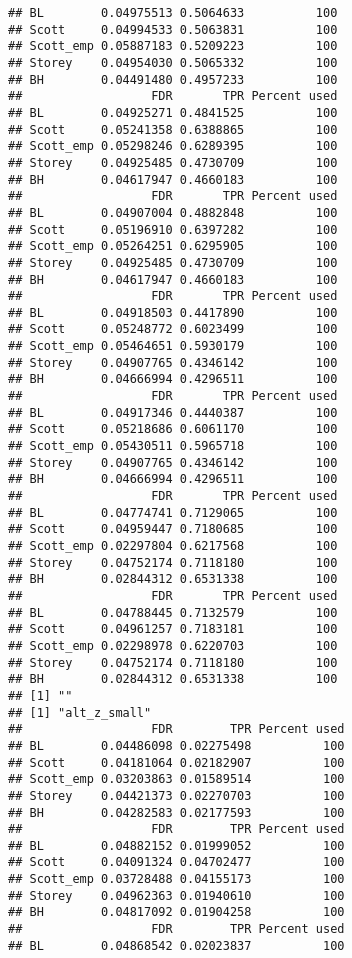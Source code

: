 \documentclass{article}\usepackage[]{graphicx}\usepackage[]{color}
\makeatletter
\newenvironment{kframe}{%
 \def\at@end@of@kframe{}%
 \ifinner\ifhmode%
  \def\at@end@of@kframe{\end{minipage}}%
  \begin{minipage}{\columnwidth}%
 \fi\fi%
 \def\FrameCommand##1{\hskip\@totalleftmargin \hskip-\fboxsep
 \colorbox{shadecolor}{##1}\hskip-\fboxsep
     \hskip-\linewidth \hskip-\@totalleftmargin \hskip\columnwidth}%
 \MakeFramed {\advance\hsize-\width
   \@totalleftmargin\z@ \linewidth\hsize
   \@setminipage}}%
 {\par\unskip\endMakeFramed%
 \at@end@of@kframe}
\newenvironment{knitrout}{}{} %
\makeatother
\begin{document}
\begin{knitrout}
\begin{kframe}
\begin{verbatim}
## BL        0.04975513 0.5064633          100
## Scott     0.04994533 0.5063831          100
## Scott_emp 0.05887183 0.5209223          100
## Storey    0.04954030 0.5065332          100
## BH        0.04491480 0.4957233          100
##                  FDR       TPR Percent used
## BL        0.04925271 0.4841525          100
## Scott     0.05241358 0.6388865          100
## Scott_emp 0.05298246 0.6289395          100
## Storey    0.04925485 0.4730709          100
## BH        0.04617947 0.4660183          100
##                  FDR       TPR Percent used
## BL        0.04907004 0.4882848          100
## Scott     0.05196910 0.6397282          100
## Scott_emp 0.05264251 0.6295905          100
## Storey    0.04925485 0.4730709          100
## BH        0.04617947 0.4660183          100
##                  FDR       TPR Percent used
## BL        0.04918503 0.4417890          100
## Scott     0.05248772 0.6023499          100
## Scott_emp 0.05464651 0.5930179          100
## Storey    0.04907765 0.4346142          100
## BH        0.04666994 0.4296511          100
##                  FDR       TPR Percent used
## BL        0.04917346 0.4440387          100
## Scott     0.05218686 0.6061170          100
## Scott_emp 0.05430511 0.5965718          100
## Storey    0.04907765 0.4346142          100
## BH        0.04666994 0.4296511          100
##                  FDR       TPR Percent used
## BL        0.04774741 0.7129065          100
## Scott     0.04959447 0.7180685          100
## Scott_emp 0.02297804 0.6217568          100
## Storey    0.04752174 0.7118180          100
## BH        0.02844312 0.6531338          100
##                  FDR       TPR Percent used
## BL        0.04788445 0.7132579          100
## Scott     0.04961257 0.7183181          100
## Scott_emp 0.02298978 0.6220703          100
## Storey    0.04752174 0.7118180          100
## BH        0.02844312 0.6531338          100
## [1] ""
## [1] "alt_z_small"
##                  FDR        TPR Percent used
## BL        0.04486098 0.02275498          100
## Scott     0.04181064 0.02182907          100
## Scott_emp 0.03203863 0.01589514          100
## Storey    0.04421373 0.02270703          100
## BH        0.04282583 0.02177593          100
##                  FDR        TPR Percent used
## BL        0.04882152 0.01999052          100
## Scott     0.04091324 0.04702477          100
## Scott_emp 0.03728488 0.04155173          100
## Storey    0.04962363 0.01940610          100
## BH        0.04817092 0.01904258          100
##                  FDR        TPR Percent used
## BL        0.04868542 0.02023837          100

\end{verbatim}
\end{kframe}
\end{knitrout}
\end{document}
